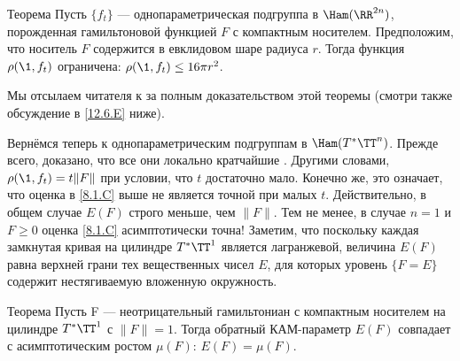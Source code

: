 \begin{thm}{Теорема}\label{8.2.A}
Пусть $\{f_t\}$ --- однопараметрическая подгруппа в $\Ham (\RR^{2n})$, порожденная гамильтоновой функцией $F$ с компактным носителем.
Предположим, что носитель $F$ содержится в евклидовом шаре радиуса $r$.
Тогда функция $\rho (\1, f_t)$ ограничена: $\rho (\1, f_t) \le 16\pi r^2$.
\end{thm}

Мы отсылаем читателя к \cite[с. 177]{HZ} за полным доказательством этой теоремы (смотри также обсуждение в \ref{12.6.E} ниже).

Вернёмся теперь к однопараметрическим подгруппам в $\Ham (T^\ast \TT^n)$.
Прежде всего, доказано, что все они локально кратчайшие \cite{LM2}.
Другими словами, $\rho (\1, f_t) = t \| F \|$ при условии, что $t$ достаточно мало.
Конечно же, это означает, что оценка в \ref{8.1.C} выше не является точной при малых $t$.
Действительно, в общем случае $E (F)$ строго меньше, чем $\| F \|$.
Тем не менее, в случае $n = 1$ и $F \ge 0$ оценка \ref{8.1.C} асимптотически точна!
Заметим, что поскольку каждая замкнутая кривая на цилиндре $T^\ast \TT^1$ является лагранжевой, величина $E (F)$ равна верхней грани тех вещественных чисел $E$, для которых уровень $\{F = E\}$ содержит нестягиваемую вложенную окружность.

\begin{thm}[(\cite{PS})]{Теорема}\label{8.2.B}
Пусть F --- неотрицательный гамильтониан с компактным носителем на цилиндре $T^\ast \TT^1$ с $\| F \| = 1$.
Тогда обратный КАМ-параметр $E (F)$ совпадает с асимптотическим ростом $\mu (F)$: $E (F) = \mu (F)$.
\end{thm}

